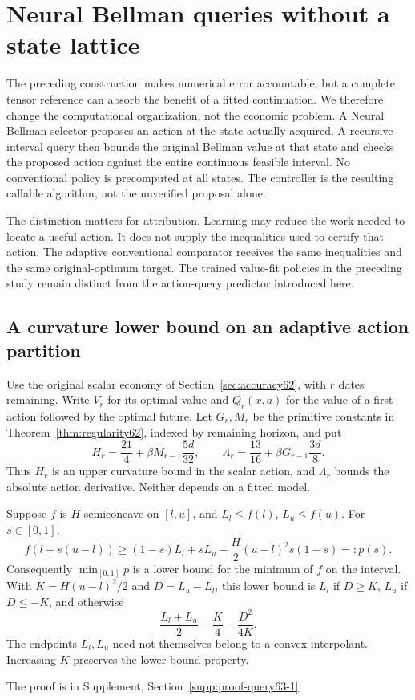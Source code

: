 \section{Neural Bellman queries without a state lattice}\label{sec:query63}
The preceding construction makes numerical error accountable, but a complete tensor reference can absorb the benefit of a fitted continuation. We therefore change the computational organization, not the economic problem. A Neural Bellman selector proposes an action at the state actually acquired. A recursive interval query then bounds the original Bellman value at that state and checks the proposed action against the entire continuous feasible interval. No conventional policy is precomputed at all states. The controller is the resulting callable algorithm, not the unverified proposal alone.

The distinction matters for attribution. Learning may reduce the work needed to locate a useful action. It does not supply the inequalities used to certify that action. The adaptive conventional comparator receives the same inequalities and the same original-optimum target. The trained value-fit policies in the preceding study remain distinct from the action-query predictor introduced here.

\subsection{A curvature lower bound on an adaptive action partition}
Use the original scalar economy of Section~\ref{sec:accuracy62}, with $r$ dates remaining. Write $V_r$ for its optimal value and $Q_r(x,a)$ for the value of a first action followed by the optimal future. Let $G_r,M_r$ be the primitive constants in Theorem~\ref{thm:regularity62}, indexed by remaining horizon, and put
\[
 H_r=\frac{21}{4}+\beta M_{r-1}\frac{5d}{32},
 \qquad \Lambda_r=\frac{13}{16}+\beta G_{r-1}\frac{3d}{8}.
\]
Thus $H_r$ is an upper curvature bound in the scalar action, and $\Lambda_r$ bounds the absolute action derivative. Neither depends on a fitted model.

\begin{lemma}\label{lem:parabolic63}
Suppose $f$ is $H$-semiconcave on $[l,u]$, and $L_l\le f(l)$, $L_u\le f(u)$. For $s\in[0,1]$,
\[
 f(l+s(u-l))\ge (1-s)L_l+sL_u
                 -\frac H2(u-l)^2s(1-s)=:p(s).
\]
Consequently $\min_{[0,1]}p$ is a lower bound for the minimum of $f$ on the interval. With $K=H(u-l)^2/2$ and $D=L_u-L_l$, this lower bound is $L_l$ if $D\ge K$, $L_u$ if $D\le-K$, and otherwise
\[
 \frac{L_l+L_u}{2}-\frac K4-\frac{D^2}{4K}.
\]
The endpoints $L_l,L_u$ need not themselves belong to a convex interpolant. Increasing $K$ preserves the lower-bound property.
\end{lemma}
\noindent The proof is in Supplement, Section~\ref{supp:proof-query63-1}.


